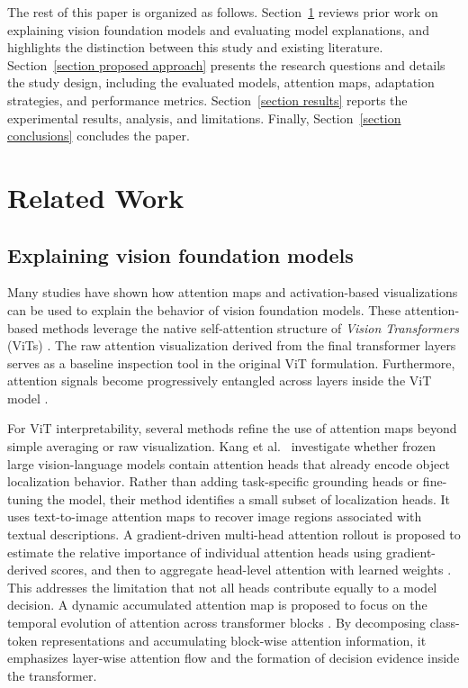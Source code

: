 \documentclass[lineno,pdflatex,sn-mathphys-num]{sn-jnl}%
\theoremstyle{thmstyleone}%
\theoremstyle{thmstyletwo}%
\theoremstyle{thmstylethree}%
\begin{document}
The rest of this paper is organized as follows. Section~\ref{section related works} reviews prior work on explaining vision foundation models and evaluating model explanations, and highlights the distinction between this study and existing literature. Section~\ref{section proposed approach} presents the research questions and details the study design, including the evaluated models, attention maps, adaptation strategies, and performance metrics. Section~\ref{section results} reports the experimental results, analysis, and limitations. Finally, Section~\ref{section conclusions} concludes the paper.

\section{Related Work} \label{section related works}

\subsection{Explaining vision foundation models}

Many studies have shown how attention maps and activation-based visualizations can be used to explain the behavior of vision foundation models. These attention-based methods leverage the native self-attention structure of \textit{Vision Transformers} (ViTs) \cite{dosovitskiy21vit}. The raw attention visualization derived from the final transformer layers serves as a baseline inspection tool in the original ViT formulation. Furthermore, attention signals become progressively entangled across layers inside the ViT model \cite{Abnar20Rollout}.

For ViT interpretability, several methods refine the use of attention maps beyond simple averaging or raw visualization. Kang et al.~\cite{Kang20259339} investigate whether frozen large vision-language models contain attention heads that already encode object localization behavior. Rather than adding task-specific grounding heads or fine-tuning the model, their method identifies a small subset of localization heads. It uses text-to-image attention maps to recover image regions associated with textual descriptions. A gradient-driven multi-head attention rollout is proposed to estimate the relative importance of individual attention heads using gradient-derived scores, and then to aggregate head-level attention with learned weights \cite{Jo2025582}. This addresses the limitation that not all heads contribute equally to a model decision. A dynamic accumulated attention map is proposed to focus on the temporal evolution of attention across transformer blocks \cite{Liao2025PR}. By decomposing class-token representations and accumulating block-wise attention information, it emphasizes layer-wise attention flow and the formation of decision evidence inside the transformer.
\end{document}
